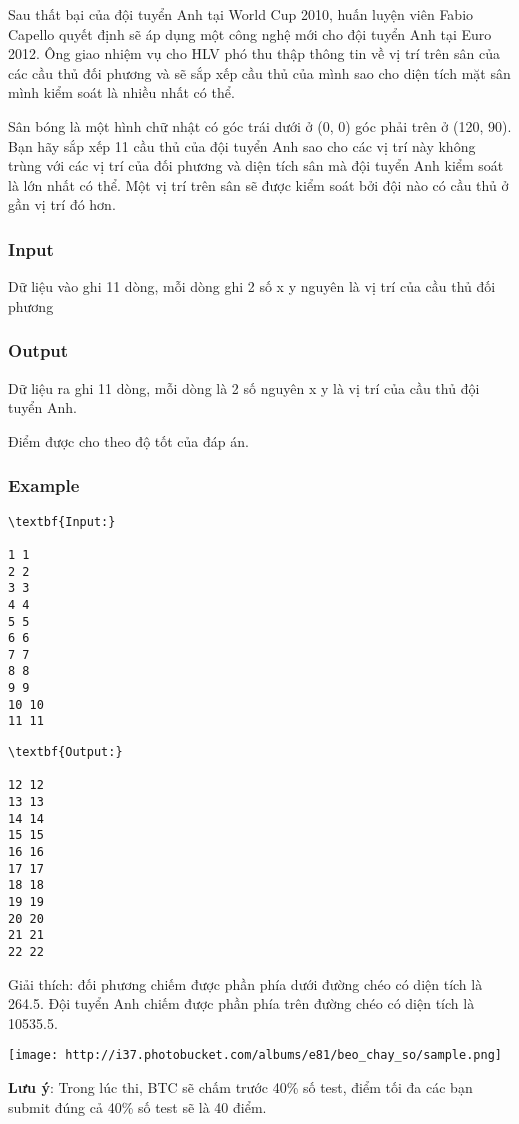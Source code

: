 

Sau thất bại của đội tuyển Anh tại World Cup 2010, huấn luyện viên Fabio Capello quyết định sẽ áp dụng một công nghệ mới cho đội tuyển Anh tại Euro 2012. Ông giao nhiệm vụ cho HLV phó thu thập thông tin về vị trí trên sân của các cầu thủ đối phương và sẽ sắp xếp cầu thủ của mình sao cho diện tích mặt sân mình kiểm soát là nhiều nhất có thể.

Sân bóng là một hình chữ nhật có góc trái dưới ở (0, 0) góc phải trên ở (120, 90). Bạn hãy sắp xếp 11 cầu thủ của đội tuyển Anh sao cho các vị trí này không trùng với các vị trí của đối phương và diện tích sân mà đội tuyển Anh kiểm soát là lớn nhất có thể. Một vị trí trên sân sẽ được kiểm soát bởi đội nào có cầu thủ ở gần vị trí đó hơn. 

\subsubsection{Input}

Dữ liệu vào ghi 11 dòng, mỗi dòng ghi 2 số x y nguyên là vị trí của cầu thủ đối phương

\subsubsection{Output}

Dữ liệu ra ghi 11 dòng, mỗi dòng là 2 số nguyên x y là vị trí của cầu thủ đội tuyển Anh.

Điểm được cho theo độ tốt của đáp án.

\subsubsection{Example}
\begin{verbatim}
\textbf{Input:}

1 1
2 2
3 3
4 4
5 5
6 6
7 7
8 8
9 9
10 10
11 11\end{verbatim}
\begin{verbatim}
\textbf{Output:}

12 12
13 13
14 14
15 15
16 16
17 17
18 18
19 19
20 20
21 21 
22 22\end{verbatim}

Giải thích: đối phương chiếm được phần phía dưới đường chéo có diện tích là 264.5. Đội tuyển Anh chiếm được phần phía trên đường chéo có diện tích là 10535.5.


\texttt{[image: http://i37.photobucket.com/albums/e81/beo\_chay\_so/sample.png]}

\textbf{Lưu ý}: Trong lúc thi, BTC sẽ chấm trước 40\% số test, điểm tối đa các bạn submit đúng cả 40\% số test sẽ là 40 điểm.
